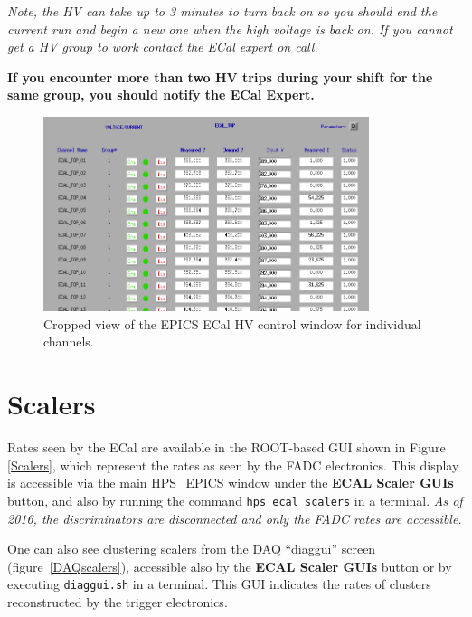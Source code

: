\documentclass[12pt]{article}
\begin{document}
      {\em Note, the HV can take up to 3 minutes to turn back on so you should end the current run and begin a new one when the high voltage is back on. If you cannot get a HV group to work contact the ECal expert on call.}

      {\bf If you encounter more than two HV trips during your shift for the same group, you should notify the ECal Expert.}

\begin{figure}[htbp]
\center
\includegraphics[width=0.85\textwidth]{pics/ecalhv_setting_2014_12_15-SUBSET.png}
\caption{ \label{HVControl} Cropped view of the EPICS ECal HV control window for individual channels.}
\end{figure}

\clearpage
\newpage
      \section{Scalers}

      Rates seen by the ECal are available in the ROOT-based GUI shown in Figure \ref{Scalers}, which represent the rates as seen by the FADC electronics.  This display is accessible via the main HPS\_EPICS window under the {\bf ECAL Scaler GUIs} button, and also by running the command \texttt{hps\_ecal\_scalers} in a terminal.  {\em As of 2016, the discriminators are disconnected and only the FADC rates are accessible.}
      
      One can also see clustering scalers from the DAQ ``diaggui'' screen (figure~\ref{DAQscalers}), accessible also by the {\bf ECAL Scaler GUIs} button or by executing \texttt{diaggui.sh} in a terminal.  This GUI indicates the rates of clusters reconstructed by the trigger electronics. 
      
\end{document}
